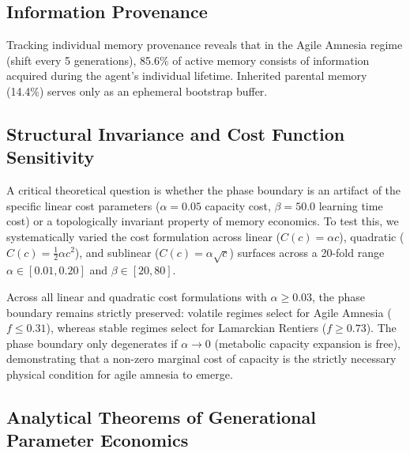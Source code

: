 \documentclass[11pt,a4paper]{article}
\begin{document}
\subsection{Information Provenance}
Tracking individual memory provenance reveals that in the Agile Amnesia regime (shift every 5 generations), 85.6\% of active memory consists of information acquired during the agent's individual lifetime. Inherited parental memory (14.4\%) serves only as an ephemeral bootstrap buffer.

\subsection{Structural Invariance and Cost Function Sensitivity}
A critical theoretical question is whether the phase boundary is an artifact of the specific linear cost parameters ($\alpha = 0.05$ capacity cost, $\beta = 50.0$ learning time cost) or a topologically invariant property of memory economics. To test this, we systematically varied the cost formulation across linear ($C(c) = \alpha c$), quadratic ($C(c) = \frac{1}{2} \alpha c^2$), and sublinear ($C(c) = \alpha \sqrt{c}$) surfaces across a 20-fold range $\alpha \in [0.01, 0.20]$ and $\beta \in [20, 80]$.

Across all linear and quadratic cost formulations with $\alpha \ge 0.03$, the phase boundary remains strictly preserved: volatile regimes select for Agile Amnesia ($f \le 0.31$), whereas stable regimes select for Lamarckian Rentiers ($f \ge 0.73$). The phase boundary only degenerates if $\alpha \to 0$ (metabolic capacity expansion is free), demonstrating that a non-zero marginal cost of capacity is the strictly necessary physical condition for agile amnesia to emerge.

\subsection{Analytical Theorems of Generational Parameter Economics}
\end{document}

